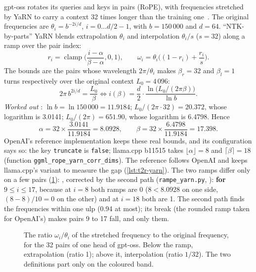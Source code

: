 gpt-oss rotates its queries and keys in pairs (RoPE), with frequencies stretched by YaRN to carry a context 32 times longer than the training one~\cite{peng2023yarn}. The original frequencies are $\theta_i = b^{-2i/d}$, $i = 0 \ldots d/2 - 1$, with $b = 150\,000$ and $d = 64$. \enquote{NTK-by-parts} YaRN blends extrapolation $\theta_i$ and interpolation $\theta_i/s$ ($s = 32$) along a ramp over the pair index:
\begin{equation}\label{eq:t2r-rampe}
r_i = \operatorname{clamp}\!\Big(\frac{i - \alpha}{\beta - \alpha}, 0, 1\Big), \qquad
\omega_i = \theta_i\Big((1 - r_i) + \frac{r_i}{s}\Big).
\end{equation}
The bounds are the pairs whose wavelength $2\pi/\theta_i$ makes $\beta_r = 32$ and $\beta_l = 1$ turns respectively over the original context $L_0 = 4\,096$:
\begin{equation}\label{eq:t2r-bornes}
2\pi\, b^{2i/d} = \frac{L_0}{\beta} \iff i(\beta) = \frac{d}{2}\cdot\frac{\ln\big(L_0/(2\pi\beta)\big)}{\ln b}.
\end{equation}
\emph{Worked out} \calc: $\ln b = \ln 150\,000 = 11.9184$; $L_0/(2\pi\cdot 32) = 20.372$, whose logarithm is 3.0141; $L_0/(2\pi) = 651.90$, whose logarithm is 6.4798. Hence
\[
\alpha = 32 \times \frac{3.0141}{11.9184} = \mathbf{8.0928}, \qquad \beta = 32 \times \frac{6.4798}{11.9184} = \mathbf{17.398}.
\]
OpenAI's reference implementation keeps these real bounds, and its configuration says so: the key \texttt{truncate} is \texttt{false}; llama.cpp b11515 takes $\lfloor\alpha\rfloor = 8$ and $\lceil\beta\rceil = 18$ (function \texttt{ggml\_rope\_\allowbreak yarn\_\allowbreak corr\_\allowbreak dims}). The reference follows OpenAI and keeps llama.cpp's variant to measure the gap (\cref{lst:t2r-yarn}). The two ramps differ only on a few pairs (\cref{fig:t2r-rampe}): , corrected by the second path (\texttt{rampe\_yarn.py}, ): \textbf{for $9 \le i \le 17$}, because at $i = 8$ both ramps are 0 ($8 < 8.0928$ on one side, $(8-8)/10 = 0$ on the other) and at $i = 18$ both are 1. The second path finds the frequencies within one ulp (0.94 at most); its break (the rounded ramp taken for OpenAI's) makes pairs 9 to 17 fall, and only them.

\begin{figure}[ht]
\centering
\GrapheRefRampe
\caption[The YaRN ramp, OpenAI against llama.cpp]{The ratio $\omega_i/\theta_i$ of the stretched frequency to the original frequency, for the 32 pairs of one head of gpt-oss. Below the ramp, extrapolation (ratio 1); above it, interpolation (ratio $1/32$). The two definitions part only on the coloured band.}
\label{fig:t2r-rampe}
\end{figure}

